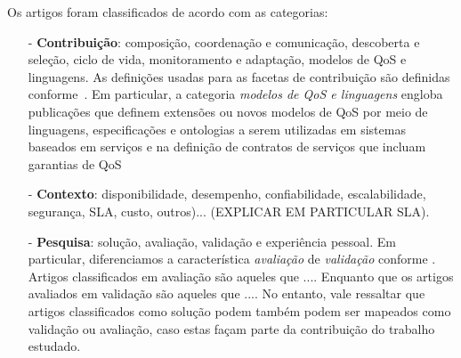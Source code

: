 Os artigos foram classificados de acordo com as categorias:
\begin{itemize}
\item[-] \textbf{Contribuição}: composição, coordenação e comunicação, descoberta e seleção, ciclo de vida, monitoramento e adaptação, modelos de QoS e linguagens. As definições usadas para as facetas de contribuição são definidas conforme~\cite{SCUBE}. Em particular, a categoria \emph{modelos de QoS e linguagens} engloba publicações que definem extensões ou novos modelos de QoS por meio de linguagens, especificações e ontologias a serem utilizadas em sistemas baseados em serviços e na definição de contratos de serviços que incluam garantias de QoS
\item[-] \textbf{Contexto}: disponibilidade, desempenho, confiabilidade, escalabilidade, segurança, SLA, custo, outros)... (EXPLICAR EM PARTICULAR SLA). 
\item[-] \textbf{Pesquisa}: solução, avaliação, validação e experiência pessoal. Em particular, diferenciamos a caracter\'{i}stica \emph{avalia\c{c}\~{a}o} de \emph{valida\c{c}\~{a}o} conforme \cite{Wiering et al. 2006}. Artigos classificados em avalia\c{c}\~{a}o s\~{a}o aqueles que .... Enquanto que os artigos avaliados em valida\c{c}\~{a}o s\~{a}o aqueles que .... No entanto, vale ressaltar que artigos classificados como solu\c{c}\~{a}o podem tamb\'{e}m podem ser mapeados como valida\c{c}\~{a}o ou avalia\c{c}\~{a}o, caso estas fa\c{c}am parte da contribui\c{c}\~{a}o do trabalho estudado.
\end{itemize}

